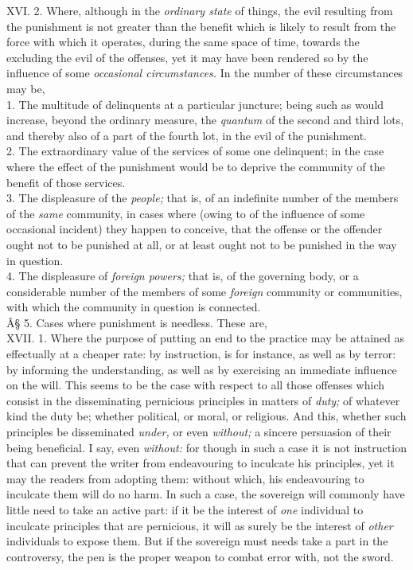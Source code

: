 \documentclass[12pt]{report}
\begin{document}
XVI. 2. Where, although in the \emph{ordinary state} of things, the evil
resulting from the punishment is not greater than the benefit which is
likely to result from the force with which it operates, during the same
space of time, towards the excluding the evil of the offenses, yet it
may have been rendered so by the influence of some \emph{occasional
circumstances.} In the number of these circumstances may be,\\
1. The multitude of delinquents at a particular juncture; being such as
would increase, beyond the ordinary measure, the \emph{quantum} of the
second and third lots, and thereby also of a part of the fourth lot, in
the evil of the punishment.\\
2. The extraordinary value of the services of some one delinquent; in
the case where the effect of the punishment would be to deprive the
community of the benefit of those services.\\
3. The displeasure of the \emph{people;} that is, of an indefinite
number of the members of the \emph{same} community, in cases where
(owing to of the influence of some occasional incident) they happen to
conceive, that the offense or the offender ought not to be punished at
all, or at least ought not to be punished in the way in question.\\
4. The displeasure of \emph{foreign powers;} that is, of the governing
body, or a considerable number of the members of some \emph{foreign}
community or communities, with which the community in question is
connected.\\

Â§ 5. Cases where punishment is needless. These are,\\
XVII. 1. Where the purpose of putting an end to the practice may be
attained as effectually at a cheaper rate: by instruction, is for
instance, as well as by terror: by informing the understanding, as well
as by exercising an immediate influence on the will. This seems to be
the case with respect to all those offenses which consist in the
disseminating pernicious principles in matters of \emph{duty;} of
whatever kind the duty be; whether political, or moral, or religious.
And this, whether such principles be disseminated \emph{under,} or even
\emph{without;} a sincere persuasion of their being beneficial. I say,
even \emph{without:} for though in such a case it is not instruction
that can prevent the writer from endeavouring to inculcate his
principles, yet it may the readers from adopting them: without which,
his endeavouring to inculcate them will do no harm. In such a case, the
sovereign will commonly have little need to take an active part: if it
be the interest of \emph{one} individual to inculcate principles that
are pernicious, it will as surely be the interest of \emph{other}
individuals to expose them. But if the sovereign must needs take a part
in the controversy, the pen is the proper weapon to combat error with,
not the sword.
\end{document}
